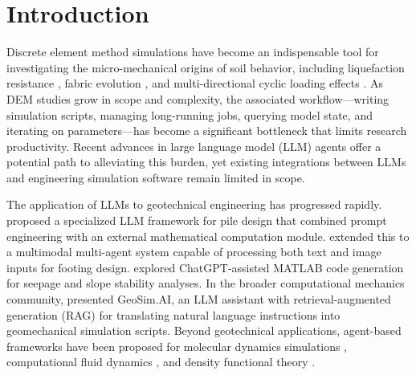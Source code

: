 \section{Introduction}
\label{sec:introduction}

Discrete element method \citep[DEM;][]{Cundall1979} simulations have become an indispensable tool for investigating the micro-mechanical origins of soil behavior, including liquefaction resistance \citep{Huang2018,Yang2021,WuYang2022}, fabric evolution \citep{Zhao2024,YangTaiebat2024}, and multi-directional cyclic loading effects \citep{Wei2020,Yang2022}. As DEM studies grow in scope and complexity, the associated workflow---writing simulation scripts, managing long-running jobs, querying model state, and iterating on parameters---has become a significant bottleneck that limits research productivity. Recent advances in large language model (LLM) agents offer a potential path to alleviating this burden, yet existing integrations between LLMs and engineering simulation software remain limited in scope.

The application of LLMs to geotechnical engineering has progressed rapidly. \citet{Xu2024} proposed a specialized LLM framework for pile design that combined prompt engineering with an external mathematical computation module. \citet{Ding2025} extended this to a multimodal multi-agent system capable of processing both text and image inputs for footing design. \citet{Kim2024} explored ChatGPT-assisted MATLAB code generation for seepage and slope stability analyses. In the broader computational mechanics community, \citet{GeoSimAI2025} presented GeoSim.AI, an LLM assistant with retrieval-augmented generation (RAG) for translating natural language instructions into geomechanical simulation scripts. Beyond geotechnical applications, agent-based frameworks have been proposed for molecular dynamics simulations \citep{AtomAgents2024,LangSim2024}, computational fluid dynamics \citep{FoamAgent2025}, and density functional theory \citep{VASPilot2025}.

